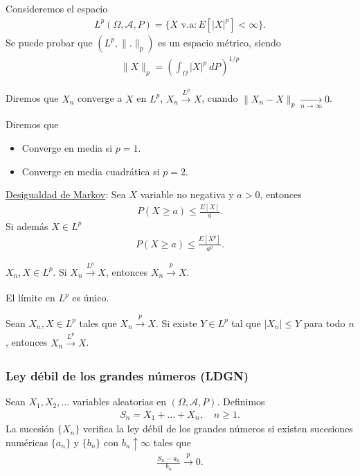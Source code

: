 Consideremos el espacio
\begin{align*}
    L^p(\Omega, \mathcal{A}, P) = \{ X \text{ v.a} : E[|X|^p] < \infty \}.
\end{align*}
Se puede probar que $(L^p, \|.\|_p)$ es un espacio métrico, siendo
\begin{align*}
    \|X \|_p = \left( \int_{\Omega} |X|^p \ dP \right)^{1/p}
\end{align*}

\begin{defi}
    Diremos que $X_n$ converge a $X$ en $L^p$, $X_n \xrightarrow[]{L^p} X$, cuando $\|X_n - X\|_p \xrightarrow[n \to \infty]{} 0$.
\end{defi}
Diremos que
\begin{itemize}
    \item Converge en media si $p = 1$.
    \item Converge en media cuadrática si $p = 2$.
\end{itemize}
\underline{Desigualdad de Markov}: Sea $X$ variable no negativa y $a>0$, entonces
\begin{align*}
    P(X \ge a) \leq \frac{E[X]}{a}.
\end{align*}
Si además $X \in L^p$
\begin{align*}
    P(X \ge a) \leq \frac{E[X^p]}{a^p}.
\end{align*}
\begin{teo}
    $X_n, X \in L^p$. Si $X_n \xrightarrow[]{L^p} X$, entonces $X_n \xrightarrow[]{p} X$.
\end{teo}

\begin{teo}
    El límite en $L^p$ es único.
\end{teo}

\begin{teo}
    Sean $X_n, X \in L^p$ tales que $X_n \xrightarrow[]{p} X$. Si existe $Y \in L^p$ tal que $|X_n| \leq Y$ para todo $n$, entonces $X_n \xrightarrow[]{L^p} X$.
\end{teo}

\subsubsection{Ley débil de los grandes números (LDGN)}
Sean $X_1,X_2,\ldots$ variables aleatorias en $(\Omega, \mathcal{A}, P)$. Definimos
\begin{align*}
    S_n = X_1 + \ldots + X_n, \quad n \ge 1.
\end{align*}
La sucesión $\{X_n\}$ verifica la ley débil de los grandes números si existen sucesiones numéricas $\{a_n\}$ y $\{b_n\}$ con $b_n \uparrow \infty$ tales que
\begin{align*}
    \frac{S_n - a_n}{b_n} \xrightarrow[\quad]{p} 0.
\end{align*}

